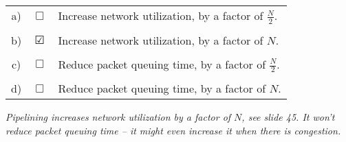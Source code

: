 \documentclass{llncs}
\newcommand{\answer}[1]{\color{red}\textit{#1}\color{black}}
\begin{document}
\begin{tabular}{ccl}
  a) & $\Box$ & Increase network utilization, by a factor of $\frac{N}{2}$.\\
  \\
  b) & $\CheckedBox$ &  Increase network utilization, by a factor of $N$.\\
  \\
  c) & $\Box$ &  Reduce packet queuing time, by a factor of $\frac{N}{2}$.\\
  \\
  d) & $\Box$ &  Reduce packet queuing time, by a factor of $N$.\\
\end{tabular}

\answer{Pipelining increases network utilization by a factor of $N$, see slide 45. It won't reduce packet queuing time -- it might even increase it when there is congestion.}
\end{document}
